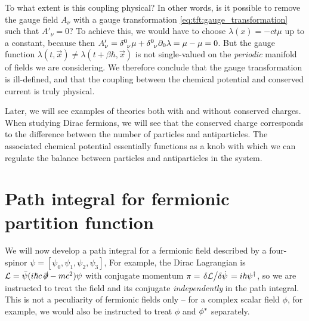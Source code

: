 To what extent is this coupling physical?
In other words, is it possible to remove the gauge field $A_\nu$ with a gauge transformation \eqref{eq:tft:gauge_transformation} such that $A'_\nu = 0$?
To achieve this, we would have to choose $\lambda(x) = -ct \mu$ up to a constant, because then $A'_\nu = \delta\indices{^0_\nu} \mu + \delta\indices{^0_\nu} \partial_0 \lambda = \mu - \mu = 0$.
But the gauge function $\lambda(t, \vec{x}) \neq \lambda(t + \beta \hbar, \vec{x})$ is not single-valued on the \emph{periodic} manifold of fields we are considering.
We therefore conclude that the gauge transformation is ill-defined, and that the coupling between the chemical potential and conserved current is truly physical.

Later, we will see examples of theories both with and without conserved charges.
When studying Dirac fermions, we will see that the conserved charge corresponds to the difference between the number of particles and antiparticles.
The associated chemical potential essentially functions as a knob with which we can regulate the balance between particles and antiparticles in the system.



\section{Path integral for fermionic partition function}

\newcommand\creat{\hat\psi^\dagger}
\newcommand\destr{\hat\psi        }

We will now develop a path integral for a fermionic field described by a four-spinor $\psi = [ \psi_0, \psi_1, \psi_2, \psi_3 ]$,
For example, the Dirac Lagrangian is $\mathcal{L} = \bar{\psi} (i \hbar c \, \slashed\partial - m c^2) \psi$ with conjugate momentum $\pi = \fdv{\lagr}/{\dot\psi} = i \hbar \smash[b]{\psi^\dagger}$, so we are instructed to treat the field and its conjugate \emph{independently} in the path integral.
This is not a peculiarity of fermionic fields only -- for a complex scalar field $\phi$, for example, we would also be instructed to treat $\phi$ and ${\phi}^*$ separately. 

